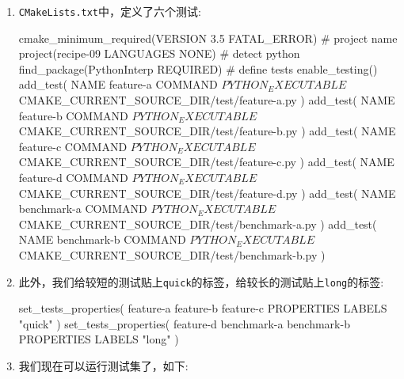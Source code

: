 \begin{enumerate}
\item \texttt{CMakeLists.txt}中，定义了六个测试:

\begin{codebox}[cmake]
cmake_minimum_required(VERSION 3.5 FATAL_ERROR)
# project name
project(recipe-09 LANGUAGES NONE)
# detect python
find_package(PythonInterp REQUIRED)
# define tests
enable_testing()
add_test(
  NAME feature-a
  COMMAND ${PYTHON_EXECUTABLE} ${CMAKE_CURRENT_SOURCE_DIR}/test/feature-a.py
  )
add_test(
  NAME feature-b
  COMMAND ${PYTHON_EXECUTABLE} ${CMAKE_CURRENT_SOURCE_DIR}/test/feature-b.py
  )
add_test(
  NAME feature-c
  COMMAND ${PYTHON_EXECUTABLE} ${CMAKE_CURRENT_SOURCE_DIR}/test/feature-c.py
  )
add_test(
  NAME feature-d
  COMMAND ${PYTHON_EXECUTABLE} ${CMAKE_CURRENT_SOURCE_DIR}/test/feature-d.py
  )
add_test(
  NAME benchmark-a
  COMMAND ${PYTHON_EXECUTABLE} ${CMAKE_CURRENT_SOURCE_DIR}/test/benchmark-a.py
  )
add_test(
  NAME benchmark-b
  COMMAND ${PYTHON_EXECUTABLE} ${CMAKE_CURRENT_SOURCE_DIR}/test/benchmark-b.py
  )
\end{codebox}

\item 此外，我们给较短的测试贴上\texttt{quick}的标签，给较长的测试贴上\texttt{long}的标签:

\begin{codebox}[cmake]
set_tests_properties(
  feature-a
  feature-b
  feature-c
  PROPERTIES
    LABELS "quick"
  )
set_tests_properties(
  feature-d
  benchmark-a
  benchmark-b
  PROPERTIES
    LABELS "long"
  )
\end{codebox}

\item 我们现在可以运行测试集了，如下:


\end{enumerate}

